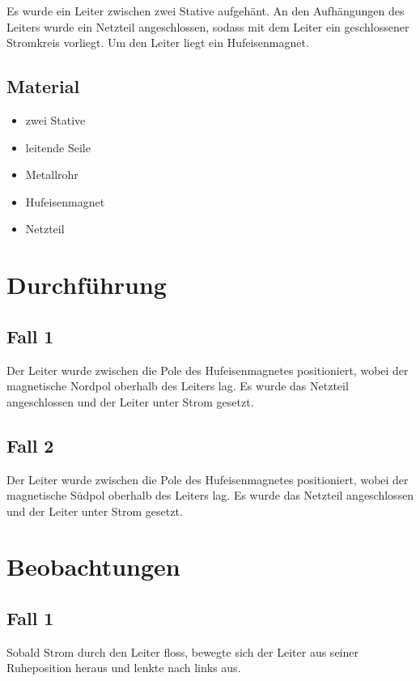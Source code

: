 \documentclass[
	fontsize=11pt,
	paper=a4,
	pagesize=auto,
	parskip=half,
	titlepage=on,
	ngerman
]{scrartcl}
\begin{document}
Es wurde ein Leiter zwischen zwei Stative aufgehänt. An den Aufhängungen des Leiters wurde ein Netzteil angeschlossen, sodass mit dem Leiter ein geschlossener Stromkreis vorliegt. Um den Leiter liegt ein Hufeisenmagnet.

\subsection{Material}

\begin{itemize}
	\item zwei Stative
	\item leitende Seile
	\item Metallrohr
	\item Hufeisenmagnet
	\item Netzteil
\end{itemize}

\section{Durchführung}

\subsection{Fall 1}

Der Leiter wurde zwischen die Pole des Hufeisenmagnetes positioniert, wobei der magnetische Nordpol oberhalb des Leiters lag. Es wurde das Netzteil angeschlossen und der Leiter unter Strom gesetzt.

\subsection{Fall 2}

Der Leiter wurde zwischen die Pole des Hufeisenmagnetes positioniert, wobei der magnetische Südpol oberhalb des Leiters lag. Es wurde das Netzteil angeschlossen und der Leiter unter Strom gesetzt.

\section{Beobachtungen}

\subsection{Fall 1}

Sobald Strom durch den Leiter floss, bewegte sich der Leiter aus seiner Ruheposition heraus und lenkte nach links aus.
\end{document}

